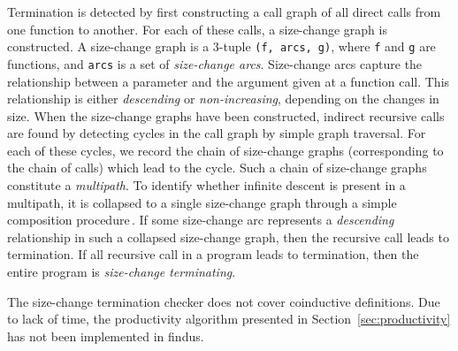 Termination is detected by first constructing a call graph of all direct calls from one function to another. For each of these calls, a size-change graph is constructed. A size-change graph is a 3-tuple \texttt{(f, arcs, g)}, where \texttt{f} and \texttt{g} are functions, and \texttt{arcs} is a set of \emph{size-change arcs}. Size-change arcs capture the relationship between a parameter and the argument given at a function call. This relationship is either \emph{descending} or \emph{non-increasing}, depending on the changes in size. When the size-change graphs have been constructed, indirect recursive calls are found by detecting cycles in the call graph by simple graph traversal. For each of these cycles, we record the chain of size-change graphs (corresponding to the chain of calls) which lead to the cycle. Such a chain of size-change graphs constitute a \emph{multipath}. To identify whether infinite descent is present in a multipath, it is collapsed to a single size-change graph through a simple composition procedure\,\citep{LeeJones01SizeChange}. If some size-change arc represents a \emph{descending} relationship in such a collapsed size-change graph, then the recursive call leads to termination. If all recursive call in a program leads to termination, then the entire program is \emph{size-change terminating}.

The size-change termination checker does not cover coinductive definitions. Due to lack of time, the productivity algorithm presented in Section~\ref{sec:productivity} has not been implemented in findus.
